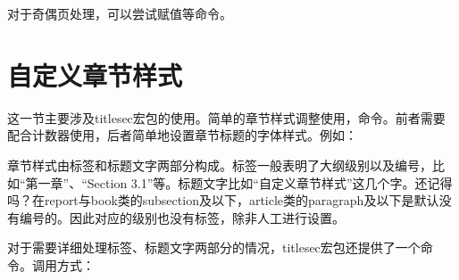 对于奇偶页处理，可以尝试赋值\latexline{\\leftskip}等命令。

\section{自定义章节样式}
\label{sec:titlesec}
这一节主要涉及titlesec宏包的使用。简单的章节样式调整使用\latexline{\\titlelabel}，\latexline{\\titleformat*}命令。前者需要配合计数器使用，后者简单地设置章节标题的字体样式。例如：

章节样式由标签和标题文字两部分构成。标签一般表明了大纲级别以及编号，比如“第一章”、“Section 3.1”等。标题文字比如“自定义章节样式”这几个字。还记得吗？在report与book类的subsection及以下，article类的paragraph及以下是默认没有编号的。因此对应的级别也没有标签，除非人工进行设置。

对于需要详细处理标签、标题文字两部分的情况，titlesec宏包还提供了一个\latexline{\\titleformat}命令。调用方式：

